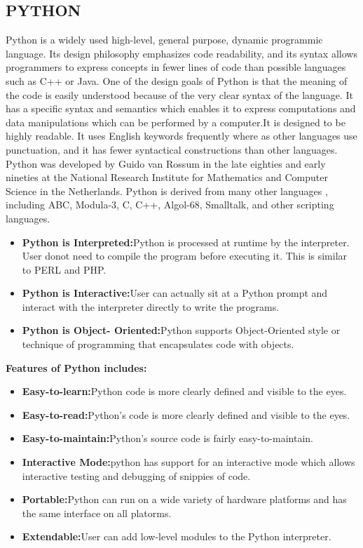 \documentclass[12pt,a4paper,oneside]{report}
\begin{document}
\subsection{PYTHON}
Python is a widely used high-level, general purpose, dynamic programmic language. Its design philosophy emphasizes code readability, and its syntax allows programmers to express concepts in fewer lines of code than possible languages such as C++ or Java. One of the design goals of Python is that the meaning of the code is easily understood because of the very clear syntax of the language. It has a specific syntax and semantics which enables it to express computations and data manipulations which can be performed by a computer.It is designed to be highly readable. It uses English keywords frequently where as other languages use punctuation, and it has fewer syntactical constructions than other languages. Python was developed by Guido van Rossum in the late eighties and early nineties at the National Research Institute for Mathematics and Computer Science in the Netherlands. Python is derived from many other languages , including ABC, Modula-3, C, C++, Algol-68, Smalltalk, and other scripting languages.\\
\begin{itemize}
\item \textbf{Python is Interpreted:}Python is processed at runtime by the interpreter. User donot need to compile the program before executing it. This is similar to PERL and PHP.
\item \textbf{Python is Interactive:}User can actually sit at a Python prompt and interact with the interpreter directly to write the programs.
\item \textbf{Python is Object- Oriented:}Python supports Object-Oriented style or technique of programming that encapsulates code with objects.
\end{itemize}
\textbf{Features of Python includes:}
\begin{itemize}
\item \textbf{Easy-to-learn:}Python code is more clearly defined and visible to the eyes.
\item \textbf{Easy-to-read:}Python's code is more clearly defined and visible to the eyes.
\item \textbf{Easy-to-maintain:}Python's source code is fairly easy-to-maintain.
\item \textbf{Interactive Mode:}python has support for an interactive mode which allows interactive testing and debugging of snippies of code.
\item \textbf{Portable:}Python can run on a wide variety of hardware platforms and has the same interface on all platorms.
\item \textbf{Extendable:}User can add low-level modules to the Python interpreter. 
\end{itemize}
\end{document}
